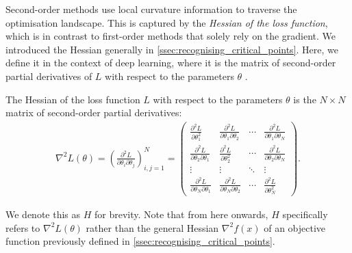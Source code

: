 Second-order methods use local curvature information to traverse the optimisation landscape. This is captured by the \textit{Hessian of the loss function}, which is in contrast to first-order methods that solely rely on the gradient. We introduced the Hessian generally in \cref{ssec:recognising_critical_points}. Here, we define it in the context of deep learning, where it is the matrix of second-order partial derivatives of $L$ with respect to the parameters $\theta$ \citep{deep_learning_book}.
\begin{definition}
    The Hessian of the loss function $L$ with respect to the parameters $\theta$ is the $N \times N$ matrix of second-order partial derivatives:
    \begin{align}
        \nabla^2 L(\theta) = \left(\frac{\partial^2 L}{\partial \theta_i \partial \theta_j}\right)_{i,j=1}^N = 
        \begin{pmatrix}
            \frac{\partial^2 L}{\partial \theta_1^2} & \frac{\partial^2 L}{\partial \theta_1 \partial \theta_2} & \cdots & \frac{\partial^2 L}{\partial \theta_1 \partial \theta_N} \\
            \frac{\partial^2 L}{\partial \theta_2 \partial \theta_1} & \frac{\partial^2 L}{\partial \theta_2^2} & \cdots & \frac{\partial^2 L}{\partial \theta_2 \partial \theta_N} \\
            \vdots & \vdots & \ddots & \vdots \\
            \frac{\partial^2 L}{\partial \theta_N \partial \theta_1} & \frac{\partial^2 L}{\partial \theta_N \partial \theta_2} & \cdots & \frac{\partial^2 L}{\partial \theta_N^2}
        \end{pmatrix}.
    \end{align}
\end{definition}
We denote this as $H$ for brevity. Note that from here onwards, $H$ specifically refers to $\nabla^2 L(\theta)$ rather than the general Hessian $\nabla^2 f(x)$ of an objective function previously defined in \cref{ssec:recognising_critical_points}.


